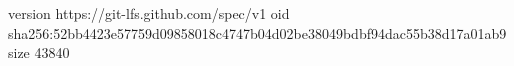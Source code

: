 version https://git-lfs.github.com/spec/v1
oid sha256:52bb4423e57759d09858018c4747b04d02be38049bdbf94dac55b38d17a01ab9
size 43840
